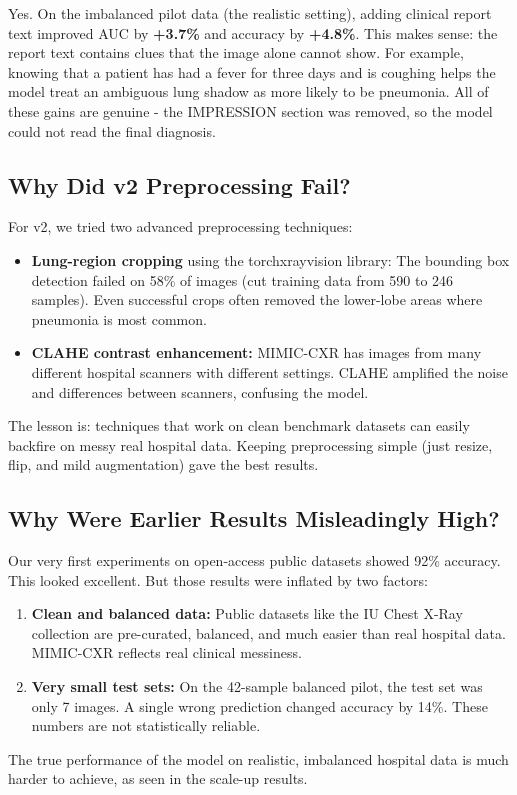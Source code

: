 \documentclass{article}
\begin{document}
Yes. On the imbalanced pilot data (the realistic setting), adding clinical
report text improved AUC by \textbf{+3.7\%} and accuracy by \textbf{+4.8\%}.
This makes sense: the report text contains clues that the image alone cannot
show. For example, knowing that a patient has had a fever for three days and
is coughing helps the model treat an ambiguous lung shadow as more likely to
be pneumonia. All of these gains are genuine - the IMPRESSION section
was removed, so the model could not read the final diagnosis.

\subsection{Why Did v2 Preprocessing Fail?}

For v2, we tried two advanced preprocessing techniques:
\begin{itemize}[noitemsep, leftmargin=*]
  \item \textbf{Lung-region cropping} using the torchxrayvision library:
        The bounding box detection failed on 58\% of images (cut training
        data from 590 to 246 samples). Even successful crops often removed
        the lower-lobe areas where pneumonia is most common.
  \item \textbf{CLAHE contrast enhancement:} MIMIC-CXR has images from
        many different hospital scanners with different settings. CLAHE
        amplified the noise and differences between scanners, confusing the model.
\end{itemize}

The lesson is: techniques that work on clean benchmark datasets can easily
backfire on messy real hospital data. Keeping preprocessing simple (just
resize, flip, and mild augmentation) gave the best results.

\subsection{Why Were Earlier Results Misleadingly High?}

Our very first experiments on open-access public datasets showed 92\%
accuracy. This looked excellent. But those results were inflated by
two factors:
\begin{enumerate}[noitemsep, leftmargin=*]
  \item \textbf{Clean and balanced data:} Public datasets like the IU Chest
        X-Ray collection are pre-curated, balanced, and much easier than
        real hospital data. MIMIC-CXR reflects real clinical messiness.
  \item \textbf{Very small test sets:} On the 42-sample balanced pilot,
        the test set was only 7 images. A single wrong prediction changed
        accuracy by 14\%. These numbers are not statistically reliable.
\end{enumerate}
The true performance of the model on realistic, imbalanced hospital data
is much harder to achieve, as seen in the scale-up results.
\end{document}
